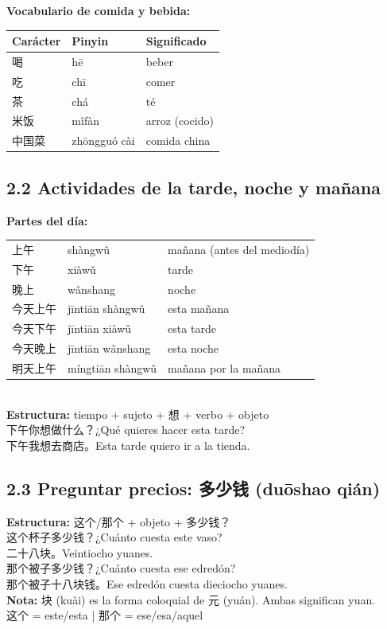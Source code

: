 \documentclass[12pt, a4paper]{article}
\begin{document}
\noindent\textbf{Vocabulario de comida y bebida:}

\begin{center}
\begin{tabular}{lll}
\toprule
\textbf{Carácter} & \textbf{Pinyin} & \textbf{Significado} \\
\midrule
喝 & hē & beber \\
吃 & chī & comer \\
茶 & chá & té \\
米饭 & mǐfàn & arroz (cocido) \\
中国菜 & zhōngguó cài & comida china \\
\bottomrule
\end{tabular}
\end{center}

\subsection{2.2 Actividades de la tarde, noche y mañana}

\begin{cuadroazul}
\textbf{Partes del día:}\\[4pt]
\begin{tabular}{lll}
上午 & shàngwǔ & mañana (antes del mediodía) \\
下午 & xiàwǔ & tarde \\
晚上 & wǎnshang & noche \\
今天上午 & jīntiān shàngwǔ & esta mañana \\
今天下午 & jīntiān xiàwǔ & esta tarde \\
今天晚上 & jīntiān wǎnshang & esta noche \\
明天上午 & míngtiān shàngwǔ & mañana por la mañana \\
\end{tabular}\\[6pt]
\textbf{Estructura:} tiempo + sujeto + 想 + verbo + objeto\\
下午你想做什么？\quad ¿Qué quieres hacer esta tarde?\\
下午我想去商店。\quad Esta tarde quiero ir a la tienda.
\end{cuadroazul}

\subsection{2.3 Preguntar precios: 多少钱 (duōshao qián)}

\begin{cuadroazul}
\textbf{Estructura:} \quad 这个/那个 + objeto + 多少钱？\\[4pt]
这个杯子多少钱？\quad ¿Cuánto cuesta este vaso?\\
二十八块。\quad Veintiocho yuanes.\\
那个被子多少钱？\quad ¿Cuánto cuesta ese edredón?\\
那个被子十八块钱。\quad Ese edredón cuesta dieciocho yuanes.\\[4pt]
\textbf{Nota:} 块 (kuài) es la forma coloquial de 元 (yuán). Ambas significan yuan.\\
这个 = este/esta \quad | \quad 那个 = ese/esa/aquel
\end{cuadroazul}
\end{document}
